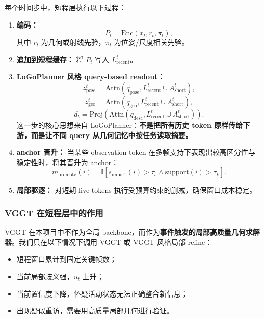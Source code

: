 \documentclass[12pt]{article}
\begin{document}
每个时间步中，短程层执行以下过程：
\begin{enumerate}
  \item \textbf{编码：}
  \begin{equation}
  P_t = \mathrm{Enc}(x_t, r_t, \pi_t),
  \end{equation}
  其中 $r_t$ 为几何或射线先验，$\pi_t$ 为位姿/尺度相关先验。

  \item \textbf{追加到短程缓存：} 将 $P_t$ 写入 $L_{\text{recent}}^t$。

  \item \textbf{LoGoPlanner 风格 query-based readout：}
  \begin{equation}
  z_{\text{pose}}^t = \mathrm{Attn}(q_{\text{pose}}, L_{\text{recent}}^t \cup A_{\text{short}}^t),
  \end{equation}
  \begin{equation}
  z_{\text{geo}}^t = \mathrm{Attn}(q_{\text{geo}}, L_{\text{recent}}^t \cup A_{\text{short}}^t),
  \end{equation}
  \begin{equation}
  d_t = \mathrm{Proj}\!\left(\mathrm{Attn}(q_{\text{desc}}, L_{\text{recent}}^t \cup A_{\text{short}}^t)\right).
  \end{equation}
  这一步的核心思想来自 LoGoPlanner：\textbf{不是把所有历史 token 原样传给下游，而是让不同 query 从几何记忆中按任务读取摘要。}

  \item \textbf{anchor 晋升：} 当某些 observation token 在多帧支持下表现出较高区分性与稳定性时，将其晋升为 anchor：
  \begin{equation}
  m_{\text{promote}}(i)=\mathbb{I}[s_{\text{import}}(i)>\tau_s \land \mathrm{support}(i)>\tau_k].
  \end{equation}

  \item \textbf{局部驱逐：} 对短期 live tokens 执行受预算约束的删减，确保窗口成本稳定。
\end{enumerate}

\subsubsection{VGGT 在短程层中的作用}

VGGT 在本项目中不作为全局 backbone，而作为\textbf{事件触发的局部高质量几何求解器}。我们只在以下情况下调用 VGGT 或 VGGT 风格局部 refine：
\begin{itemize}
  \item 短程窗口累计到固定关键帧数；
  \item 当前局部歧义强，$u_t$ 上升；
  \item 当前置信度下降，怀疑活动状态无法正确整合新信息；
  \item 出现疑似重访，需要用高质量局部几何进行验证。
\end{itemize}
\end{document}
